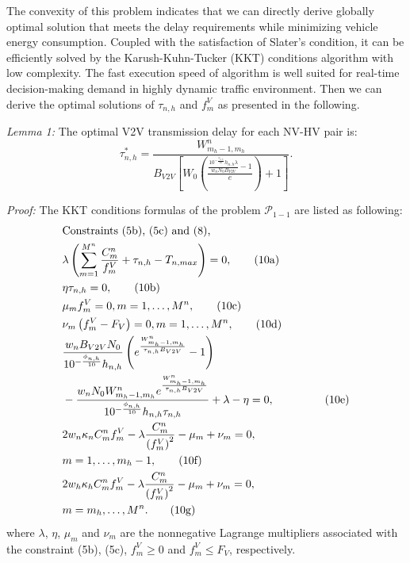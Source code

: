 \documentclass[lettersize,journal]{IEEEtran}
\begin{document}
The convexity of this problem indicates that we can directly derive globally optimal solution that meets the delay requirements while minimizing vehicle energy consumption. Coupled with the satisfaction of Slater's condition, it can be efficiently solved by the Karush-Kuhn-Tucker (KKT) conditions algorithm with low complexity. The fast execution speed of algorithm is well suited for real-time decision-making demand in highly dynamic traffic environment. Then we can derive the optimal solutions of $\tau_{n,h}$ and $f^{V}_{m}$ as presented in the following.

\emph{Lemma 1:} The optimal V2V transmission delay for each NV-HV pair is:
\begin{equation*}
\tau^*_{n,h}=\frac {W_{m_h-1,m_h}^n}{B_{V2V} \left [{W_{0} \left ({\frac {\frac{10^{-\frac{\phi_{n,h}}{10}} h_{n,h}\lambda }{w_n N_0B_{V2V}}-1}{e}}\right)+1 }\right]}. \tag{9}
\end{equation*}


\emph{Proof:} The KKT conditions formulas of the problem $\mathcal{P}_{1-1}$ are listed as following:
\vspace{-0.2cm}
\begin{align*}
&\text{Constraints (5b), (5c) and (8),}  \\
&\lambda \left( \sum_{m=1}^{M^n} \frac{C_m^n}{f^{V}_{m}}+\tau_{n,h} - T_{n,max}\right) = 0, \tag{10a}\\
&\eta \tau_{n,h} = 0, \tag{10b}\\
&\mu_m f^V_{m} = 0, m=1,\ldots,M^n, \tag{10c}\\
&\nu_m \left(f^V_{m}-F_V\right) = 0, m=1,\ldots,M^n, \tag{10d}\\
&\frac {w_nB_{V2V}N_0}{10^{-\frac{\phi_{n,h}}{10}} h_{n,h}} \left( e^{\frac {W_{m_h-1,m_h}^n}{\tau _{n,h}B_{V2V}}}-1\right) \\
&-\frac {w_n N_0 W_{m_h-1,m_h}^n e^{\frac {W_{m_h-1,m_h}^n }{\tau _{n,h}B_{V2V}}}}{10^{-\frac{\phi_{n,h}}{10}} h_{n,h}\tau _{n,h}} +\lambda -\eta =0, \hspace{0.9cm} \tag{10e}\\
&2w_n\kappa_{n} C_m^n f^{V}_{m} -\lambda \frac{C_m^n}{\left ({f^{V}_{m}}\right)^{2}} -\mu _{m} + \nu _{m}=0,\\
&m=1,\ldots, m_h-1, \tag{10f}\\
&2w_h\kappa_{h} C_m^n f^{V}_{m} -\lambda \frac{C_m^n}{\left ({f^{V}_{m}}\right)^{2}} -\mu _{m} + \nu _{m}=0,\\
&m=m_h,\ldots, M^n. \tag{10g}\\
\end{align*}
where $\lambda$, $\eta$, $\mu_m$ and $\nu_m$ are the nonnegative Lagrange multipliers associated with the constraint (5b), (5c), $f^V_{m}\geq 0$ and $f^V_{m}\leq F_V$, respectively.
\end{document}
